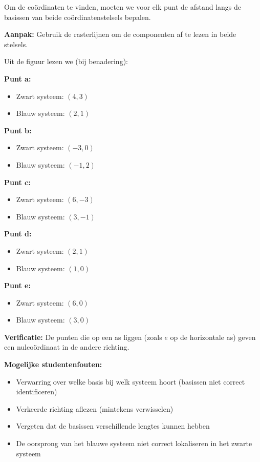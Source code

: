 \documentclass{ximera}
\begin{document}
\begin{freeResponse}
Om de coördinaten te vinden, moeten we voor elk punt de afstand langs de basissen van beide coördinatenstelsels bepalen.

\textbf{Aanpak:} Gebruik de rasterlijnen om de componenten af te lezen in beide stelsels.

Uit de figuur lezen we (bij benadering):

\textbf{Punt a:}
\begin{itemize}
\item Zwart systeem: $(4, 3)$
\item Blauw systeem: $(2, 1)$
\end{itemize}

\textbf{Punt b:}
\begin{itemize}
\item Zwart systeem: $(-3, 0)$
\item Blauw systeem: $(-1, 2)$
\end{itemize}

\textbf{Punt c:}
\begin{itemize}
\item Zwart systeem: $(6, -3)$
\item Blauw systeem: $(3, -1)$
\end{itemize}

\textbf{Punt d:}
\begin{itemize}
\item Zwart systeem: $(2, 1)$
\item Blauw systeem: $(1, 0)$
\end{itemize}

\textbf{Punt e:}
\begin{itemize}
\item Zwart systeem: $(6, 0)$
\item Blauw systeem: $(3, 0)$
\end{itemize}

\textbf{Verificatie:} De punten die op een as liggen (zoals $e$ op de horizontale as) geven een nulcoördinaat in de andere richting.

\textbf{Mogelijke studentenfouten:}
\begin{itemize}
\item Verwarring over welke basis bij welk systeem hoort (basissen niet correct identificeren)
\item Verkeerde richting aflezen (mintekens verwisselen)
\item Vergeten dat de basissen verschillende lengtes kunnen hebben
\item De oorsprong van het blauwe systeem niet correct lokaliseren in het zwarte systeem
\end{itemize}
\end{freeResponse}
\end{document}

